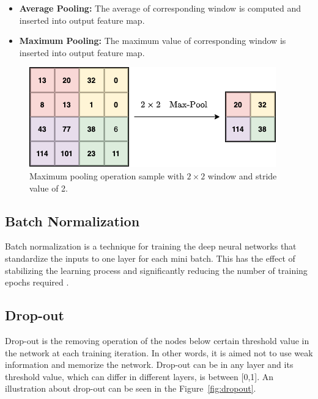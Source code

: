 \begin{itemize}
	\item \textbf{Average Pooling:}  The average of corresponding window is computed and inserted into output feature map.
	\item \textbf{Maximum Pooling:}  The maximum value of corresponding window is inserted into output feature map.
\end{itemize}

\begin{figure}[h]
	\centering
	\includegraphics[width=1.0\linewidth]{fig/maxPool.png}
	\vspace*{1mm}
	\caption{Maximum pooling operation sample with 
		$2 \times 2$ window and stride value of 2.}
	\label{fig:maxpooling}
\end{figure}

\subsection{Batch Normalization}

Batch normalization is a technique for training the deep neural networks that standardize the inputs to one layer for each mini batch. This has the effect of stabilizing the learning process and significantly reducing the number of training epochs required \cite{A_novelCNNModel}.

\subsection{Drop-out}

Drop-out is the removing operation of the nodes below certain threshold value in the network at each training iteration. In other words, it is aimed not to use weak information and memorize the network. Drop-out can be in any layer and its threshold value, which can differ in different layers,  is between [0,1]. An illustration about drop-out can be seen in the Figure~\ref{fig:dropout}.

